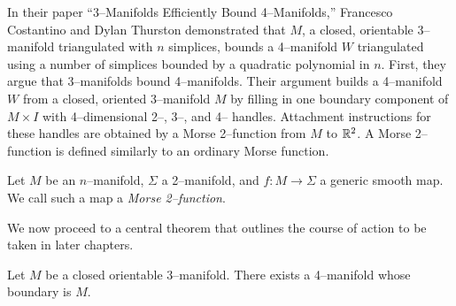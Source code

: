 \label{sec:bounding}

In their paper ``3--Manifolds Efficiently Bound 4--Manifolds,'' Francesco Costantino and Dylan Thurston demonstrated that $M$, a closed, orientable 3--manifold triangulated with $n$ simplices, bounds a 4--manifold $W$ triangulated using a number of simplices bounded by a quadratic polynomial in $n$.
First, they argue that 3--manifolds bound 4--manifolds.
Their argument builds a 4--manifold $W$ from a closed, oriented 3--manifold $M$ by filling in one boundary component of $M\times I$ with 4--dimensional 2--, 3--, and 4-- handles.
Attachment instructions for these handles are obtained by a Morse 2--function from $M$ to $\mathbb{R}^2$.
A Morse 2--function is defined similarly to an ordinary Morse function.

\begin{defn}
	Let $M$ be an $n$--manifold, $\Sigma$ a 2--manifold, and $f:M\to\Sigma$ a generic smooth map.
	We call such a map a \emph{Morse 2--function}.
\end{defn}


We now proceed to a central theorem that outlines the course of action to be taken in later chapters.

\begin{theorem}
	\label{thm:3bound4}
	Let $M$ be a closed orientable 3--manifold.
	There exists a 4--manifold whose boundary is $M$.
\end{theorem}

